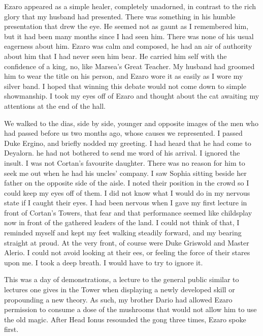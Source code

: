 \documentclass{article}
\begin{document}
Ezaro appeared as a simple healer, completely unadorned, in contrast to the rich glory that my husband had presented. There was something in his humble presentation that drew the eye. He seemed not as gaunt as I remembered him, but it had been many months since I had seen him. There was none of his usual eagerness about him. Ezaro was calm and composed, he had an air of authority about him that I had never seen him bear. He carried him self  with the confidence of a king, no, like Marsea's Great Teacher. My husband had groomed him to wear the title on his person, and Ezaro wore it as easily as I wore my silver band. I hoped that winning this debate would not come down to simple showmanship. I took my eyes off of Ezaro and thought about the cat awaiting my attentions at the end of the hall. 

We walked to the dias, side by side, younger and opposite images of the men who had passed before us two months ago, whose causes we represented. I passed Duke Ergino, and briefly nodded my greeting. I had heard that he had come to Deyalorn. he had not bothered to send me word of his arrival. I ignored the insult. I was not Cortan's favourite daughter. There was no reason for him to seek me out when he had his uncles' company. I saw Sophia sitting beside her father on the opposite side of the aisle. I noted their position in the crowd so I could keep my eyes off of them. I did not know what I would do in my nervous state if I caught their eyes. I had been nervous when I gave my first lecture in front of Cortan's Towers, that fear and that performance seemed like childsplay now in front of the gathered leaders of the land. I could not think of that, I reminded myself and kept my feet walking steadily forward, and my bearing straight at proud. At the very front, of course were Duke Griswold and Master Alerio. I could not avoid looking at their ees, or feeling the force of their stares upon me. I took a deep breath. I would have to try to ignore it. 

This was a day of demonstrations, a lecture to the general public similar to lectures one gives in the Tower when displaying a newly developed skill or propounding a new theory. As such, my brother Dario had allowed Ezaro permission to consume a dose of the mushrooms that would not allow him to use the old magic. After Head Ionus resounded the gong three times, Ezaro spoke first. 
\end{document}

